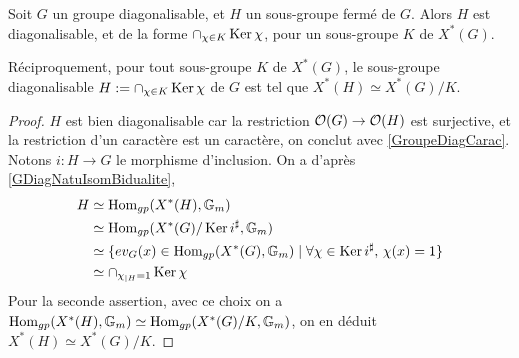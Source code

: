 \begin{prop}
Soit $G$ un groupe diagonalisable, et $H$ un sous-groupe fermé de $G$. Alors $H$ est diagonalisable, et de la forme $\cap_{\chi\in K}\operatorname{Ker}\chi$, pour un sous-groupe $K$ de $X^*(G)$. 

Réciproquement, pour tout sous-groupe $K$ de $X^*(G)$, le sous-groupe diagonalisable $H:=\cap_{\chi\in K}\operatorname{Ker}\chi$ de $G$ est tel que $X^*(H)\simeq X^*(G)/K$.
\end{prop}
\begin{proof}
$H$ est bien diagonalisable car la restriction $\mathcal{O}(G)\rightarrow \mathcal{O}(H)$ est surjective, et la restriction d'un caractère est un caractère, on conclut avec \ref{GroupeDiagCarac}. Notons $i:H\rightarrow G$ le morphisme d'inclusion. On a d'après \ref{GDiagNatuIsomBidualite}, 
\begin{equation}
\begin{split}
H & \simeq\operatorname{Hom}_{gp}(X^*(H),\mathbb{G}_m) \\
    & \simeq\operatorname{Hom}_{gp}(X^*(G)/\operatorname{Ker} i^\sharp,\mathbb{G}_m)\\
    &\simeq\lbrace ev_G(x)\in\operatorname{Hom}_{gp}(X^*(G),\mathbb{G}_m)\mid\forall \chi\in\operatorname{Ker} i^\sharp,\,\chi(x)=1\rbrace\\
    &\simeq\cap_{\chi_{|H}=1}\operatorname{Ker} \chi
\end{split}
\end{equation}
Pour la seconde assertion, avec ce choix on a  $\operatorname{Hom}_{gp}(X^*(H),\mathbb{G}_m)\simeq\operatorname{Hom}_{gp}(X^*(G)/K,\mathbb{G}_m)$, on en déduit $X^*(H)\simeq X^*(G)/K$.
\end{proof}

